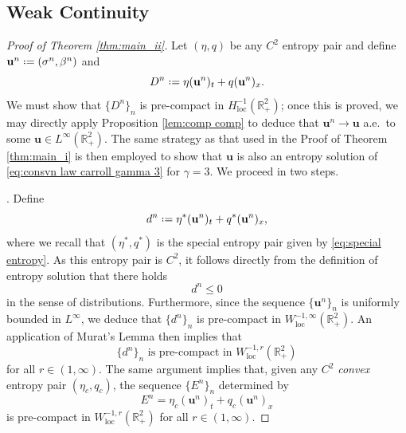 \documentclass[11pt,a4paper,reqno]{amsart}
\numberwithin{equation}{section}
\theoremstyle{definition}
\theoremstyle{remark}
\newcommand{\bu}{\mathbf{u}}
\newcommand{\loc}{\mathrm{loc}}
\renewcommand{\leq}{\leqslant}
\newcommand*{\defeq}{\mathrel{\vcenter{\baselineskip0.5ex \lineskiplimit0pt
                     \hbox{\scriptsize.}\hbox{\scriptsize.}}}%
                     =}
\begin{document}
{\subsection{Weak Continuity}\label{sec:weak continuity}

\begin{proof}[Proof of Theorem \ref{thm:main_ii}]
    Let $(\eta,q)$ be any $C^2$ entropy pair and define $\bu^n \defeq (\sigma^n,\beta^n)$ and 
    \begin{equation*}
        D^n \defeq \eta(\bu^n)_t + q(\bu^n)_x. 
    \end{equation*}
    We must show that $\{D^n\}_n$ is pre-compact in $H^{-1}_\loc(\mathbb{R}^2_+)$; once this is proved, we may directly apply Proposition \ref{lem:comp comp} to deduce that $\bu^n \to \bu$ a.e.~to some $\bu \in L^\infty(\mathbb{R}^2_+)$. The same strategy as that used in the Proof of Theorem \ref{thm:main_i} is then employed to show that $\bu$ is also an entropy solution of \eqref{eq:consvn law carroll gamma 3} for $\gamma=3$. We proceed in two steps. 


    \smallskip 
    . Define $$ d^n \defeq \eta^*(\bu^n)_t + q^*(\bu^n)_x, $$
    where we recall that $(\eta^*,q^*)$ is the special entropy pair given by \eqref{eq:special entropy}. As this entropy pair is $C^2$, it follows directly from the definition of entropy solution that there holds 
    $$d^n \leq 0$$
    in the sense of distributions. Furthermore, since the sequence $\{\bu^n\}_n$ is uniformly bounded in $L^\infty$, we deduce that $\{d^n\}_n$ is pre-compact in $W^{-1,\infty}_\loc(\mathbb{R}^2_+)$. An application of Murat's Lemma \cite{muratcone} then implies that $$\{d^n\}_n \text{ is pre-compact in } W^{-1,r}_\loc(\mathbb{R}^2_+)$$ for all $r \in (1,\infty)$. The same argument implies that, given any $C^2$ \emph{convex} entropy pair $(\eta_c,q_c)$, the sequence $\{E^n\}_n$ determined by 
        \begin{equation*}
        E^n = \eta_c(\bu^n)_t + q_c(\bu^n)_x 
    \end{equation*}
    is pre-compact in $W^{-1,r}_\loc(\mathbb{R}^2_+)$ for all $r \in (1,\infty)$. 


\end{proof}}
\end{document}
